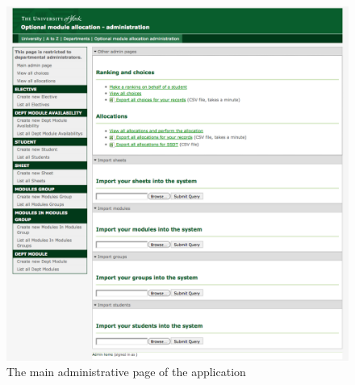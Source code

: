 \begin{landscape}
  \begin{figure}
    \begin{minipage}{0.49\linewidth}
      \centering
      \includegraphics[width=\linewidth]{images/walkthrough/admin_main.png}
      \caption{The main administrative page of the application}
      \label{walkthrough_admin_main}
    \end{minipage}
    \hspace{0.5cm}
    \begin{minipage}{0.48\linewidth}
      \centering

\end{minipage}
\end{figure}
\end{landscape}
